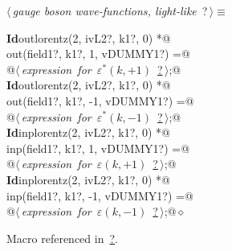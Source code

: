 \documentclass[a4paper,12pt]{amsart}
\renewcommand{\NWtarget}[2]{\hypertarget{#1}{#2}}
\renewcommand{\NWlink}[2]{\hyperlink{#1}{#2}}
\renewcommand{\NWtxtMacroRefIn}{Macro referenced in}
\renewcommand{\NWsep}{${\diamond}$}
\begin{document}
\begin{flushleft} \small
\begin{minipage}{\linewidth}\label{scrap23}\raggedright\small
\NWtarget{nuweb?}{} $\langle\,${\it gauge boson wave-functions, light-like}\nobreak\ {\footnotesize {?}}$\,\rangle\equiv$
\vspace{-1ex}
\begin{list}{}{} \item
\mbox{}\verb@@\hbox{\sffamily\bfseries Id}\verb@ outlorentz(2, ivL2?, k1?, 0) *@\\
\mbox{}\verb@      out(field1?, k1?,  1, vDUMMY1?) =@\\
\mbox{}\verb@   @\hbox{$\langle\,${\it expression for $\varepsilon^\ast(k, +1)$}\nobreak\ {\footnotesize \NWlink{nuweb?}{?}}$\,\rangle$}\verb@;@\\
\mbox{}\verb@@\hbox{\sffamily\bfseries Id}\verb@ outlorentz(2, ivL2?, k1?, 0) *@\\
\mbox{}\verb@      out(field1?, k1?, -1, vDUMMY1?) =@\\
\mbox{}\verb@   @\hbox{$\langle\,${\it expression for $\varepsilon^\ast(k, -1)$}\nobreak\ {\footnotesize \NWlink{nuweb?}{?}}$\,\rangle$}\verb@;@\\
\mbox{}\verb@@\hbox{\sffamily\bfseries Id}\verb@ inplorentz(2, ivL2?, k1?, 0) *@\\
\mbox{}\verb@      inp(field1?, k1?,  1, vDUMMY1?) =@\\
\mbox{}\verb@   @\hbox{$\langle\,${\it expression for $\varepsilon(k, +1)$}\nobreak\ {\footnotesize \NWlink{nuweb?}{?}}$\,\rangle$}\verb@;@\\
\mbox{}\verb@@\hbox{\sffamily\bfseries Id}\verb@ inplorentz(2, ivL2?, k1?, 0) *@\\
\mbox{}\verb@      inp(field1?, k1?, -1, vDUMMY1?) =@\\
\mbox{}\verb@   @\hbox{$\langle\,${\it expression for $\varepsilon(k, -1)$}\nobreak\ {\footnotesize \NWlink{nuweb?}{?}}$\,\rangle$}\verb@;@{\NWsep}
\end{list}
\vspace{-1.5ex}
\footnotesize
\begin{list}{}{\setlength{\itemsep}{-\parsep}\setlength{\itemindent}{-\leftmargin}}
\item \NWtxtMacroRefIn\ \NWlink{nuweb?}{?}.

\item{}
\end{list}
\end{minipage}\vspace{4ex}
\end{flushleft}
\end{document}
